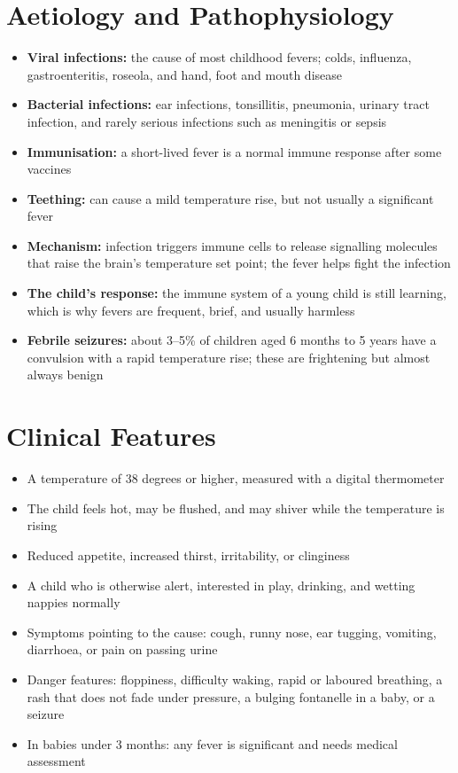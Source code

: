 \section*{Aetiology and Pathophysiology}
\begin{itemize}
    \item \textbf{Viral infections:} the cause of most childhood fevers; colds, influenza, gastroenteritis, roseola, and hand, foot and mouth disease
    \item \textbf{Bacterial infections:} ear infections, tonsillitis, pneumonia, urinary tract infection, and rarely serious infections such as meningitis or sepsis
    \item \textbf{Immunisation:} a short-lived fever is a normal immune response after some vaccines
    \item \textbf{Teething:} can cause a mild temperature rise, but not usually a significant fever
    \item \textbf{Mechanism:} infection triggers immune cells to release signalling molecules that raise the brain's temperature set point; the fever helps fight the infection
    \item \textbf{The child's response:} the immune system of a young child is still learning, which is why fevers are frequent, brief, and usually harmless
    \item \textbf{Febrile seizures:} about 3--5\% of children aged 6 months to 5 years have a convulsion with a rapid temperature rise; these are frightening but almost always benign
\end{itemize}

\section*{Clinical Features}
\begin{itemize}
    \item A temperature of 38 degrees or higher, measured with a digital thermometer
    \item The child feels hot, may be flushed, and may shiver while the temperature is rising
    \item Reduced appetite, increased thirst, irritability, or clinginess
    \item A child who is otherwise alert, interested in play, drinking, and wetting nappies normally
    \item Symptoms pointing to the cause: cough, runny nose, ear tugging, vomiting, diarrhoea, or pain on passing urine
    \item Danger features: floppiness, difficulty waking, rapid or laboured breathing, a rash that does not fade under pressure, a bulging fontanelle in a baby, or a seizure
    \item In babies under 3 months: any fever is significant and needs medical assessment
\end{itemize}

